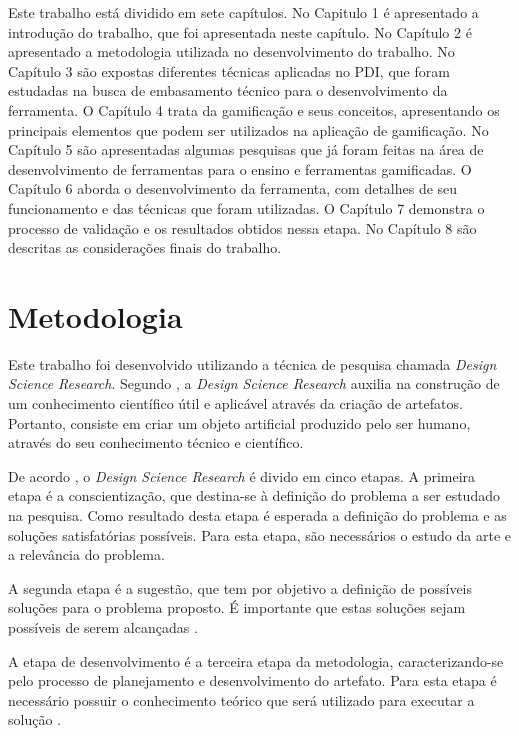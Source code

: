 \documentclass[
	12pt,				%
	oneside,			%
	a4paper,			%
	english,			%
	french,				%
	spanish,			%
	brazil,				%
	]{abntex2}
\begin{document}
Este trabalho está dividido em sete capítulos. No Capitulo 1 é apresentado a introdução do trabalho, que foi apresentada neste capítulo. No Capítulo 2 é apresentado a metodologia utilizada no desenvolvimento do trabalho. No Capítulo 3 são expostas diferentes técnicas aplicadas no PDI, que foram estudadas na busca de embasamento técnico para o desenvolvimento da ferramenta. O Capítulo 4 trata da gamificação e seus conceitos, apresentando os principais elementos que podem ser utilizados na aplicação de gamificação. No Capítulo 5 são apresentadas algumas pesquisas que já foram feitas na área de desenvolvimento de ferramentas para o ensino e ferramentas gamificadas. O Capítulo 6 aborda o desenvolvimento da ferramenta, com detalhes de seu funcionamento e das técnicas que foram utilizadas. O Capítulo 7 demonstra o processo de validação e os resultados obtidos nessa etapa. No Capítulo 8 são descritas as considerações finais do trabalho.

\chapter{Metodologia}

Este trabalho foi desenvolvido utilizando a técnica de pesquisa chamada \textit{Design Science Research}. Segundo \citet{dresch:2015}, a \textit{Design
Science Research} auxilia na construção de um conhecimento científico útil e aplicável através da criação de artefatos. Portanto, consiste em criar um objeto artificial produzido pelo ser humano, através do seu conhecimento técnico e científico.

De acordo \citet{dresch:2015}, o \textit{Design
Science Research} é divido em cinco etapas. A primeira etapa é a conscientização, que destina-se à definição do problema a ser estudado na pesquisa. Como resultado desta etapa é esperada a definição do problema e as soluções satisfatórias possíveis. Para esta etapa, são necessários o estudo da arte e a relevância do problema.

A segunda etapa é a sugestão, que tem por objetivo a definição de possíveis soluções para o problema proposto. É importante que estas soluções sejam possíveis de serem alcançadas \cite{dresch:2015}.

A etapa de desenvolvimento é a terceira etapa da metodologia, caracterizando-se pelo processo de planejamento e desenvolvimento do artefato. Para esta etapa é necessário possuir o conhecimento teórico que será utilizado para executar a solução \cite{dresch:2015}.
\end{document}
